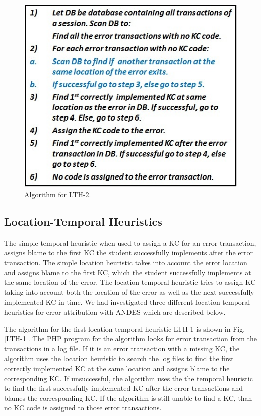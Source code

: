 \documentclass[conference]{IEEEtran}
\begin{document}
\begin{figure}
\centering
\includegraphics[scale=0.7]{LTH-2.jpg}
\caption{Algorithm for LTH-2.}
\label{LTH-2}
\end{figure}



\subsection{Location-Temporal Heuristics}
The simple temporal heuristic when used to assign a KC for an error transaction, assigns blame to the first KC the student successfully implements after the error transaction. The simple location heuristic takes into account the error location and assigns blame to the first KC, which the student successfully implements at the same location of the error. The location-temporal heuristic tries to assign KC taking into account both the location of the error as well as the next successfully implemented KC in time. We had investigated three different location-temporal heuristics for error attribution with ANDES which are described below.


The algorithm for the first location-temporal heuristic LTH-1 is shown in Fig. \ref{LTH-1}. The PHP program for the algorithm looks for error transaction from the transactions in a log file. If it is an error transaction with a missing KC, the algorithm uses the location heuristic to search the log files to find the first correctly implemented KC at the same location and assigns blame to the corresponding KC. If unsuccessful, the algorithm uses the the temporal heuristic to find the first successfully implemented KC after the error transactions and blames the corresponding KC. If the algorithm is still unable to find a KC, than no KC code is assigned to those error transactions.
\end{document}

